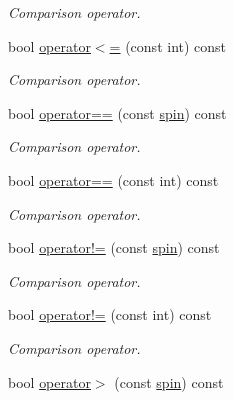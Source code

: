 \begin{DoxyCompactItemize}
\begin{DoxyCompactList}\small\item\em Comparison operator. \end{DoxyCompactList}\item 
\hypertarget{a00501_a102824635dbdeb84b9499cc7a8e002ad}{bool \hyperlink{a00501_a102824635dbdeb84b9499cc7a8e002ad}{operator$<$=} (const int) const }\label{a00501_a102824635dbdeb84b9499cc7a8e002ad}

\begin{DoxyCompactList}\small\item\em Comparison operator. \end{DoxyCompactList}\item 
\hypertarget{a00501_a9754c7f96977344f3aed8db8d4bfc199}{bool \hyperlink{a00501_a9754c7f96977344f3aed8db8d4bfc199}{operator==} (const \hyperlink{a00501}{spin}) const }\label{a00501_a9754c7f96977344f3aed8db8d4bfc199}

\begin{DoxyCompactList}\small\item\em Comparison operator. \end{DoxyCompactList}\item 
\hypertarget{a00501_ac587da3709184b3f6926c4191d96fdc2}{bool \hyperlink{a00501_ac587da3709184b3f6926c4191d96fdc2}{operator==} (const int) const }\label{a00501_ac587da3709184b3f6926c4191d96fdc2}

\begin{DoxyCompactList}\small\item\em Comparison operator. \end{DoxyCompactList}\item 
\hypertarget{a00501_a70acc47532264f10d33937224c9d0ff7}{bool \hyperlink{a00501_a70acc47532264f10d33937224c9d0ff7}{operator!=} (const \hyperlink{a00501}{spin}) const }\label{a00501_a70acc47532264f10d33937224c9d0ff7}

\begin{DoxyCompactList}\small\item\em Comparison operator. \end{DoxyCompactList}\item 
\hypertarget{a00501_a2ab72ec0dd126d99407f7e83459b1a07}{bool \hyperlink{a00501_a2ab72ec0dd126d99407f7e83459b1a07}{operator!=} (const int) const }\label{a00501_a2ab72ec0dd126d99407f7e83459b1a07}

\begin{DoxyCompactList}\small\item\em Comparison operator. \end{DoxyCompactList}\item 
\hypertarget{a00501_add363e45f83aaaec04d337886dde0f71}{bool \hyperlink{a00501_add363e45f83aaaec04d337886dde0f71}{operator$>$} (const \hyperlink{a00501}{spin}) const }\label{a00501_add363e45f83aaaec04d337886dde0f71}


\end{DoxyCompactItemize}
